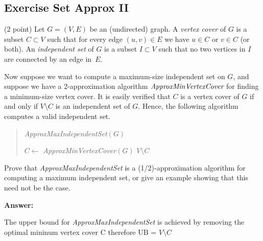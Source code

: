\documentclass{article}
\newcounter{rcounter}
\newenvironment{rlist}%
{\begin{list}{\setnr-\arabic{rcounter}}{\usecounter{rcounter}}}{\end{list}}
\begin{document}
    \subsection*{Exercise Set Approx II}
    \begin{rlist}
        \item (2 point)
        Let $G=(V,E)$ be an (undirected) graph. A \emph{vertex cover} of $G$  is a subset $C\subset V$ such that for every edge $(u,v)\in E$ we have $u\in C$ or $v\in C$ (or both). An \emph{independent set} of $G$ is a subset $I\subset V$ such that no two vertices in $I$ are connected by an edge in~$E$.
        
        Now suppose we want to compute a maximum-size independent set on $G$, and suppose we have a 2-approximation algorithm $\emph{ApproxMinVertexCover}$ for finding a minimum-size vertex cover. It is easily verified that $C$ is a vertex cover of $G$ if and only if $V\setminus C$ is an independent set of $G$. Hence, the following algorithm computes a valid independent set.
        
        \begin{algorithm}
            \vspace*{2mm}
            \begin{quotation}
                \noindent
                \emph{ApproxMaxIndependentSet}$(G)$ \\[-5mm]
                \begin{algorithmic}[1]
                    \State $C \gets$ \emph{ApproxMinVertexCover}$(G)$  
                    \State \Return $V\setminus C$
                \end{algorithmic}
            \end{quotation}
        \end{algorithm}
        
        Prove that \emph{ApproxMaxIndependentSet} is a (1/2)-approximation algorithm for computing a maximum independent set, or give an example showing that this need not be the case.
        
        \textbf{Answer:}
        
        The upper bound for \emph{ApproxMaxIndependentSet} is achieved by removing the optimal mininum vertex cover C therefore UB = $V \setminus C$
        

\end{rlist}
\end{document}
